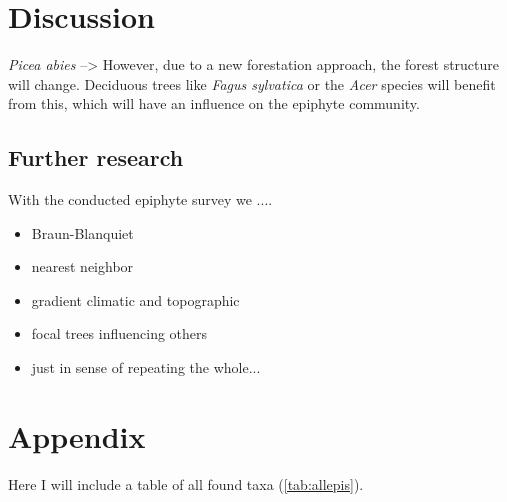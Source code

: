 \documentclass[12pt, a4paper,oneside]{article}
\begin{document}
\section{Discussion}


\textit{Picea abies} -->  However, due to a new forestation approach, the forest structure will change. Deciduous trees like \textit{Fagus sylvatica} or the  \textit{Acer} species will benefit from this, which will have an influence on the epiphyte community.

\subsection{Further research}
With the conducted epiphyte survey we ....
	\begin{itemize}
	\item Braun-Blanquiet
	\item nearest neighbor
	\item gradient climatic and topographic
	\item focal trees influencing others
	\item just in sense of repeating the whole...
	\end{itemize}

\newpage
\printbibliography[title={References}]
\section{Appendix}
\setcounter{table}{0}
\renewcommand{\thetable}{A-\arabic{table}}
Here I will include a table of all found taxa (\autoref{tab:allepis}).\\	





\listoftodos

\end{document}
